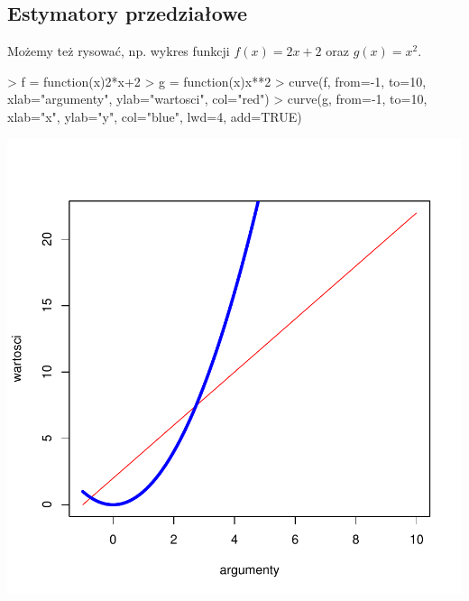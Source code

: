 \documentclass{article}
\begin{document}
\subsection{Estymatory przedziałowe}
Możemy też rysować, np. wykres funkcji $f(x)=2x+2$ oraz $g(x)=x^2$.
\begin{Schunk}
\begin{Sinput}
> f = function(x){2*x+2}
> g = function(x){x**2}
> curve(f, from=-1, to=10, xlab="argumenty", ylab="wartosci", col="red")
> curve(g, from=-1, to=10, xlab="x", ylab="y", col="blue", lwd=4, add=TRUE)
\end{Sinput}
\end{Schunk}
\includegraphics{Untitled-wykresyfg}
\end{document}
